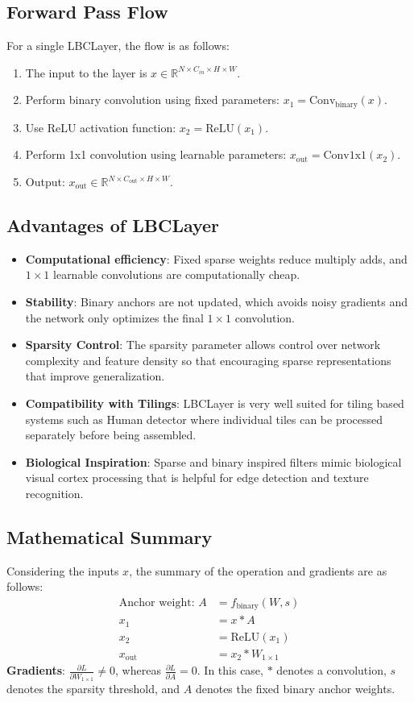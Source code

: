 \subsection*{Forward Pass Flow}
For a single LBCLayer, the flow is as follows:
\begin{enumerate}
    \item The input to the layer is $x \in \mathbb{R}^{N \times C_{in} \times H \times W}$.
    \item Perform binary convolution using fixed parameters: $x_1 = \text{Conv}_{\text{binary}}(x)$.
    \item Use ReLU activation function: $x_2 = \text{ReLU}(x_1)$.
    \item Perform 1x1 convolution using learnable parameters: $x_{\text{out}} = \text{Conv1x1}(x_2)$.
    \item Output: $x_{\text{out}} \in \mathbb{R}^{N \times C_{\text{out}} \times H \times W}$.
\end{enumerate}
\subsection*{Advantages of LBCLayer}
\begin{itemize}
    \item \textbf{Computational efficiency}: Fixed sparse weights reduce multiply adds, and $1\times1$ learnable convolutions are computationally cheap.
    \item \textbf{Stability}: Binary anchors are not updated, which avoids noisy gradients and the network only optimizes the final $1\times1$ convolution.
    \item \textbf{Sparsity Control}: The sparsity parameter allows control over network complexity and feature density so that encouraging sparse representations that improve generalization.
    \item \textbf{Compatibility with Tilings}: LBCLayer is very well suited for tiling based systems such as
Human detector where individual tiles can be processed separately before being assembled.
    \item \textbf{Biological Inspiration}: Sparse and binary inspired filters mimic biological visual cortex
processing that is helpful for edge detection and texture recognition.
\end{itemize}
\subsection*{Mathematical Summary}
Considering the inputs $x$, the summary of the operation and gradients are as follows:
\begin{align*}
    \text{Anchor weight: } A &= f_{\text{binary}}(W, s) \\
    x_1 &= x * A \\
    x_2 &= \text{ReLU}(x_1) \\
    x_{\text{out}} &= x_2 * W_{1\times1} 
\end{align*}
\textbf{Gradients}: $\frac{\partial L}{\partial W_{1\times1}} \neq 0$, whereas $\frac{\partial L}{\partial A} = 0$. 
In this case, $*$ denotes a convolution, $s$ denotes the sparsity threshold, and $A$ denotes the fixed binary anchor weights.
